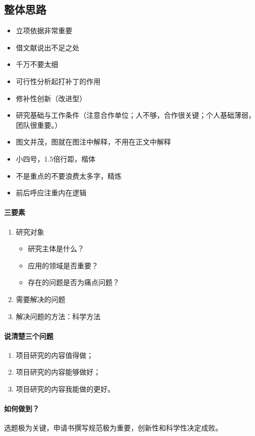 \subsection{整体思路}
\begin{itemize}
\item 立项依据非常重要
\item 借文献说出不足之处
\item 千万不要太细
\item 可行性分析起打补丁的作用
\item 修补性创新（改进型）
\item 研究基础与工作条件（注意合作单位；人不够，合作很关键；个人基础薄弱，团队很重要。）
\item 图文并茂，图就在图注中解释，不用在正文中解释
\item 小四号，1.5倍行距，楷体
\item 不是重点的不要浪费太多字，精炼
\item 前后呼应注重内在逻辑
\end{itemize}


\paragraph{三要素}
\begin{enumerate}
\item 研究对象
\begin{itemize}
\item 研究主体是什么？
\item 应用的领域是否重要？
\item 存在的问题是否为痛点问题？
\end{itemize}

\item 需要解决的问题

\item 解决问题的方法：科学方法
\end{enumerate}


\paragraph{说清楚三个问题}
\begin{enumerate}
\item 项目研究的内容值得做；
\item 项目研究的内容能够做好； 
\item 项目研究的内容我能做的更好。
\end{enumerate}

\paragraph{如何做到？}
选题极为关键，申请书撰写规范极为重要，创新性和科学性决定成败。


